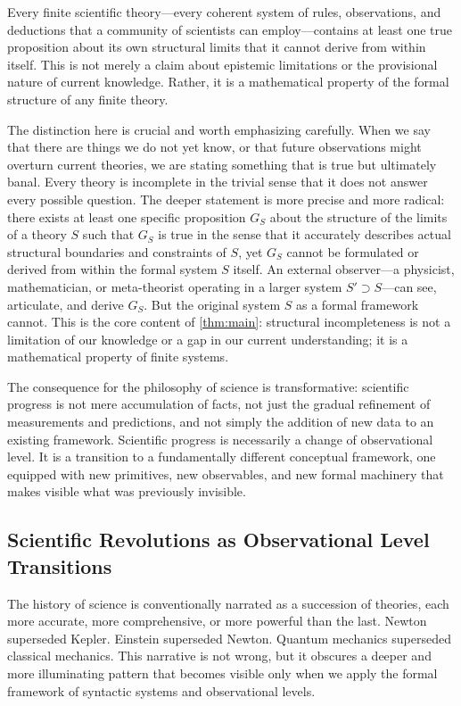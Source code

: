 \documentclass[11pt]{article}
\begin{document}
Every finite scientific theory—every coherent system of rules, observations, and deductions that a community of scientists can employ—contains at least one true proposition about its own structural limits that it cannot derive from within itself. This is not merely a claim about epistemic limitations or the provisional nature of current knowledge. Rather, it is a mathematical property of the formal structure of any finite theory.

The distinction here is crucial and worth emphasizing carefully. When we say that there are things we do not yet know, or that future observations might overturn current theories, we are stating something that is true but ultimately banal. Every theory is incomplete in the trivial sense that it does not answer every possible question. The deeper statement is more precise and more radical: there exists at least one specific proposition $G_S$ about the structure of the limits of a theory $S$ such that $G_S$ is true in the sense that it accurately describes actual structural boundaries and constraints of $S$, yet $G_S$ cannot be formulated or derived from within the formal system $S$ itself. An external observer—a physicist, mathematician, or meta-theorist operating in a larger system $S' \supset S$—can see, articulate, and derive $G_S$. But the original system $S$ as a formal framework cannot. This is the core content of \ref{thm:main}: structural incompleteness is not a limitation of our knowledge or a gap in our current understanding; it is a mathematical property of finite systems.

The consequence for the philosophy of science is transformative: scientific progress is not mere accumulation of facts, not just the gradual refinement of measurements and predictions, and not simply the addition of new data to an existing framework. Scientific progress is necessarily a change of observational level. It is a transition to a fundamentally different conceptual framework, one equipped with new primitives, new observables, and new formal machinery that makes visible what was previously invisible.


\subsection{Scientific Revolutions as Observational Level Transitions}
\label{subsec:revolutions_as_transitions}

The history of science is conventionally narrated as a succession of theories, each more accurate, more comprehensive, or more powerful than the last. Newton superseded Kepler. Einstein superseded Newton. Quantum mechanics superseded classical mechanics. This narrative is not wrong, but it obscures a deeper and more illuminating pattern that becomes visible only when we apply the formal framework of syntactic systems and observational levels.
\end{document}
